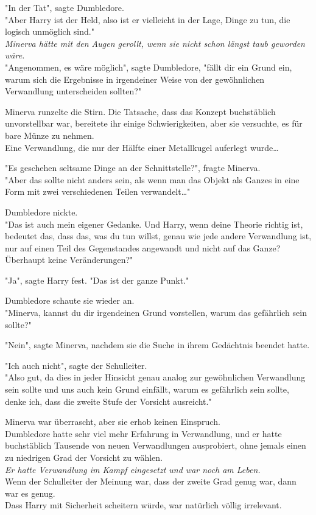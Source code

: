 {"In der Tat", sagte Dumbledore.\\ "Aber Harry ist der Held, also ist er vielleicht in der Lage, Dinge zu tun, die logisch unmöglich sind."\\ \emph{Minerva hätte mit den Augen gerollt, wenn sie nicht schon längst taub geworden wäre.}\\ "Angenommen, es wäre möglich", sagte Dumbledore, "fällt dir ein Grund ein, warum sich die Ergebnisse in irgendeiner Weise von der gewöhnlichen Verwandlung unterscheiden sollten?"

Minerva runzelte die Stirn. Die Tatsache, dass das Konzept buchstäblich unvorstellbar war, bereitete ihr einige Schwierigkeiten, aber sie versuchte, es für bare Münze zu nehmen.\\ Eine Verwandlung, die nur der Hälfte einer Metallkugel auferlegt wurde…

"Es geschehen seltsame Dinge an der Schnittstelle?", fragte Minerva.\\ "Aber das sollte nicht anders sein, als wenn man das Objekt als Ganzes in eine Form mit zwei verschiedenen Teilen verwandelt…"

Dumbledore nickte.\\ "Das ist auch mein eigener Gedanke. Und Harry, wenn deine Theorie richtig ist, bedeutet das, dass das, was du tun willst, genau wie jede andere Verwandlung ist, nur auf einen Teil des Gegenstandes angewandt und nicht auf das Ganze? Überhaupt keine Veränderungen?"

"Ja", sagte Harry fest. "Das ist der ganze Punkt."

Dumbledore schaute sie wieder an.\\ "Minerva, kannst du dir irgendeinen Grund vorstellen, warum das gefährlich sein sollte?"

"Nein", sagte Minerva, nachdem sie die Suche in ihrem Gedächtnis beendet hatte.

"Ich auch nicht", sagte der Schulleiter.\\ "Also gut, da dies in jeder Hinsicht genau analog zur gewöhnlichen Verwandlung sein sollte und uns auch kein Grund einfällt, warum es gefährlich sein sollte, denke ich, dass die zweite Stufe der Vorsicht ausreicht."

Minerva war überrascht, aber sie erhob keinen Einspruch.\\ Dumbledore hatte sehr viel mehr Erfahrung in Verwandlung, und er hatte buchstäblich Tausende von neuen Verwandlungen ausprobiert, ohne jemals einen zu niedrigen Grad der Vorsicht zu wählen.\\ \emph{Er hatte Verwandlung im Kampf eingesetzt und war noch am Leben.}\\ Wenn der Schulleiter der Meinung war, dass der zweite Grad genug war, dann war es genug.\\ Dass Harry mit Sicherheit scheitern würde, war natürlich völlig irrelevant.

}
